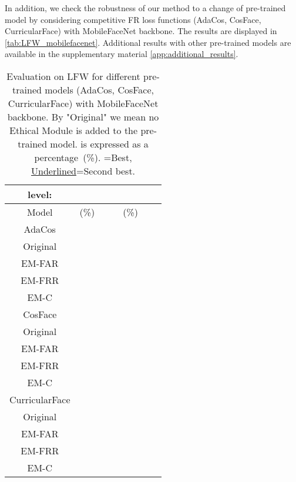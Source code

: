 \documentclass[nohyperref]{article}
\theoremstyle{plain}
\theoremstyle{definition}
\theoremstyle{remark}
\begin{document}
In addition, we check the robustness of our method to a change of pre-trained model by considering competitive FR loss functions (AdaCos, CosFace, CurricularFace) with MobileFaceNet backbone. The results are displayed in \autoref{tab:LFW_mobilefacenet}. Additional results with other pre-trained models are available in the supplementary material \ref{app:additional_results}.






\begin{table*}
\caption{Evaluation on LFW for different pre-trained models (AdaCos, CosFace, CurricularFace) with MobileFaceNet backbone. By "Original" we mean no Ethical Module is added to the pre-trained model.  is expressed as a percentage~(\%). =Best, \underline{Underlined}=Second best.}
\vskip 0.1in
\begin{center}
\begin{small}
\begin{sc}
\begin{tabular}{ c | ccc | ccc}
   level:         & \multicolumn{3}{c}{ } & \multicolumn{3}{c}{ } \\ 
 \toprule
  Model    &  (\%)  &   &   &  (\%)  &         &         \\ \midrule \midrule
  AdaCos&&&&&&\\
\midrule                              Original  &  &  &  &   &  &  \\
  EM-FAR &  &  &   &  &  &   \\
                 EM-FRR &  &  &  &  &   &  \\
         EM-C &  &   &  &  &  &   \\ \midrule \midrule
  CosFace&&&&&&\\
\midrule
             Original  &  &  &  &   &   &   \\
 EM-FAR &  &  &   &  &  &   \\
 EM-FRR &  &  &  &  &   &  \\
 EM-C &  &  &  &  &  &  \\ 
 \midrule \midrule
  CurricularFace&&&&&&\\
\midrule
 Original  &  &  &  &   &  &   \\
   EM-FAR &  &  &   &  &   &   \\
 EM-FRR &  &  &  &  &   &  \\
 EM-C &  &  &  &  &  &   \\ \bottomrule
\end{tabular}
\label{tab:LFW_mobilefacenet}
\end{sc}
\end{small}
\end{center}
\vskip -0.1in
\end{table*}
\end{document}
